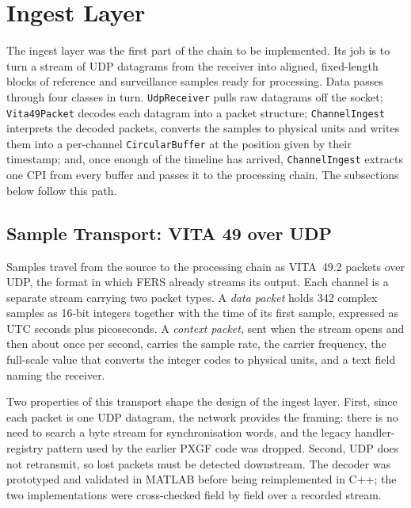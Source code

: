 \section{Ingest Layer}
\label{sec:ch4.ingest}

The ingest layer was the first part of the chain to be implemented. Its job is to turn a stream of UDP datagrams from the receiver into aligned, fixed-length blocks of reference and surveillance samples ready for processing. Data passes through four classes in turn. \texttt{UdpReceiver} pulls raw datagrams off the socket; \texttt{Vita49Packet} decodes each datagram into a packet structure; \texttt{ChannelIngest} interprets the decoded packets, converts the samples to physical units and writes them into a per-channel \texttt{CircularBuffer} at the position given by their timestamp; and, once enough of the timeline has arrived, \texttt{ChannelIngest} extracts one CPI from every buffer and passes it to the processing chain. The subsections below follow this path.

\subsection{Sample Transport: VITA 49 over UDP}
\label{subsec:ch4.ingest.vita49}

Samples travel from the source to the processing chain as VITA~49.2 packets over UDP, the format in which FERS already streams its output. Each channel is a separate stream carrying two packet types. A \emph{data packet} holds 342 complex samples as 16-bit integers together with the time of its first sample, expressed as UTC seconds plus picoseconds. A \emph{context packet}, sent when the stream opens and then about once per second, carries the sample rate, the carrier frequency, the full-scale value that converts the integer codes to physical units, and a text field naming the receiver.

Two properties of this transport shape the design of the ingest layer. First, since each packet is one UDP datagram, the network provides the framing: there is no need to search a byte stream for synchronisation words, and the legacy handler-registry pattern used by the earlier PXGF code was dropped. Second, UDP does not retransmit, so lost packets must be detected downstream. The decoder was prototyped and validated in MATLAB before being reimplemented in C++; the two implementations were cross-checked field by field over a recorded stream.


